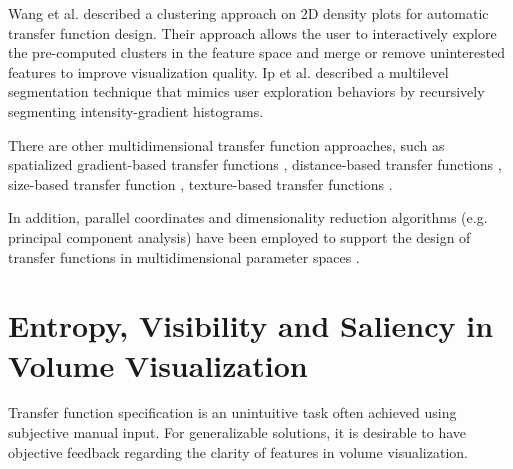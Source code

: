 \documentclass{egpubl}
\begin{document}
Wang et al. \cite{wang_automating_2012} described a clustering approach on 2D density plots for automatic transfer function design. Their approach allows the user to interactively explore the pre-computed clusters in the feature space and merge or remove uninterested features to improve visualization quality.
Ip et al. \cite{ip_hierarchical_2012} described a multilevel segmentation technique that mimics user exploration behaviors by recursively segmenting intensity-gradient histograms.

There are other multidimensional transfer function approaches, such as spatialized gradient-based transfer functions \cite{roettger_spatialized_2005}, distance-based transfer functions \cite{tappenbeck_distance-based_2006}, size-based transfer function \cite{correa_size-based_2008}, texture-based transfer functions \cite{caban_texture-based_2008} \cite{alper_selver_exploring_2015}.

In addition, parallel coordinates and dimensionality reduction algorithms (e.g. principal component analysis) have been employed to support the design of transfer functions in multidimensional parameter spaces \cite{zhao_multi-dimensional_2010} \cite{guo_multi-dimensional_2011} \cite{kim_dimensionality_2010}.

\section{Entropy, Visibility and Saliency in Volume Visualization}
Transfer function specification is an unintuitive task often achieved using subjective manual input. For generalizable solutions, it is desirable to have objective feedback regarding the clarity of features in volume visualization.
\end{document}
